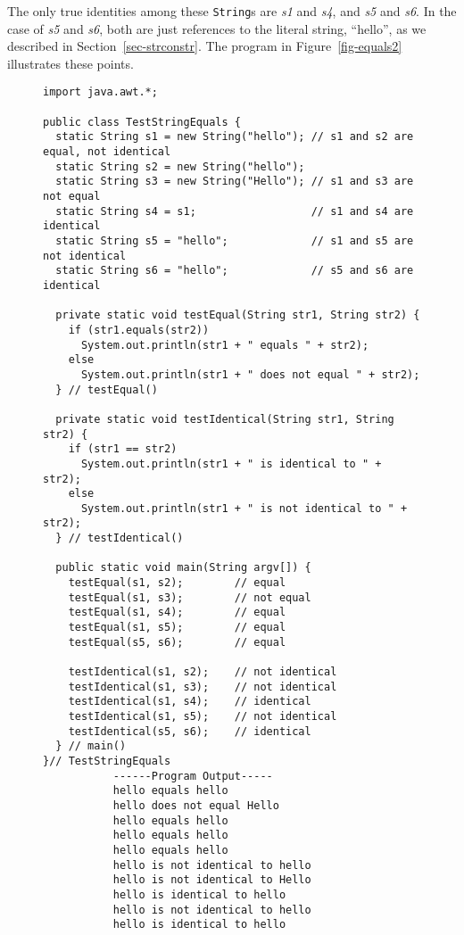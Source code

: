 \noindent The only true identities among these {\tt String}s are {\it s1} and {\it s4},
and {\it s5} and {\it s6}.  In the case of {\it s5} and {\it s6}, both
are just references to the literal string, ``hello'', as we described
in Section~\ref{sec-strconstr}.  The program in Figure~\ref{fig-equals2}
illustrates these points. 

\begin{figure}[p]
\jjjprogstart
\begin{jjjlisting}[35pc]
\begin{lstlisting}
import java.awt.*;

public class TestStringEquals {
  static String s1 = new String("hello"); // s1 and s2 are equal, not identical
  static String s2 = new String("hello");
  static String s3 = new String("Hello"); // s1 and s3 are not equal
  static String s4 = s1;                  // s1 and s4 are identical
  static String s5 = "hello";             // s1 and s5 are not identical
  static String s6 = "hello";             // s5 and s6 are identical

  private static void testEqual(String str1, String str2) {
    if (str1.equals(str2))
      System.out.println(str1 + " equals " + str2);
    else
      System.out.println(str1 + " does not equal " + str2);
  } // testEqual()

  private static void testIdentical(String str1, String str2) {
    if (str1 == str2)
      System.out.println(str1 + " is identical to " + str2);
    else
      System.out.println(str1 + " is not identical to " + str2);
  } // testIdentical()

  public static void main(String argv[]) {
    testEqual(s1, s2);        // equal
    testEqual(s1, s3);        // not equal
    testEqual(s1, s4);        // equal
    testEqual(s1, s5);        // equal
    testEqual(s5, s6);        // equal

    testIdentical(s1, s2);    // not identical
    testIdentical(s1, s3);    // not identical
    testIdentical(s1, s4);    // identical
    testIdentical(s1, s5);    // not identical
    testIdentical(s5, s6);    // identical
  } // main()
}// TestStringEquals
           ------Program Output-----
           hello equals hello
           hello does not equal Hello
           hello equals hello
           hello equals hello
           hello equals hello
           hello is not identical to hello
           hello is not identical to Hello
           hello is identical to hello
           hello is not identical to hello
           hello is identical to hello
\end{lstlisting}
\end{jjjlisting}
\end{figure}

